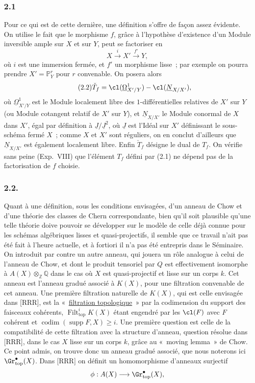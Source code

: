 \subsubsection*{2.1}
Pour ce qui est de cette dernière, une définition s'offre de façon assez évidente. On utilise le fait que le morphisme $f$, grâce à l'hypothèse d'existence d'un Module inversible ample sur $X$ et sur $Y$, peut se factoriser en
\begin{equation}\tag{2.1}
X\xrightarrow{i}X'\xrightarrow{f'}Y,
\end{equation}
où $i$ est une immersion fermée, et $f'$ un morphisme lisse~; par exemple on pourra prendre $X'=\mathbb P^r_Y$ pour $r$ convenable. On posera alors
\begin{equation}\tag{2.2}
\check T_f=\cl({\underline\Omega}^1_{X'/Y})-\cl({\underline N}_{X/X'}),
\end{equation}
où ${\underline\Omega}^1_{X'/Y}$ est le Module localement libre des $1$-différentielles relatives de $X'$ sur $Y$ (ou Module cotangent relatif de $X'$ sur $Y$), et ${\underline N}_{X/X'}$ le Module conormal de $X$ dans $X'$, égal par définition à ${\underline J}/{\underline J}^2$, où ${\underline J}$ est l'Idéal sur $X'$ définissant le sous-schéma fermé $X$~; comme $X$ et $X'$ sont réguliers, on en conclut d'ailleurs que ${\underline N}_{X/X'}$ est également localement libre. Enfin $\check T_f$ désigne le dual de $T_f$. On vérifie sans peine (Exp.\ VIII) que l'élément $T_f$ défini par (2.1) ne dépend pas de la factorisation de $f$ choisie.

\subsubsection*{2.2.}
Quant à une définition, sous les conditions envisagées, d'un anneau de Chow et d'une théorie des classes de Chern correspondante, bien qu'il soit plausible qu'une telle théorie doive pouvoir se développer sur le modèle de celle déjà connue pour les schémas algébriques lisses et quasi-projectifs, il semble que ce travail n'ait pas été fait à l'heure actuelle, et à fortiori il n'a pas été entrepris dans le Séminaire. On introduit par contre un autre anneau, qui jouera un rôle analogue à celui de l'anneau de Chow, et dont le produit tensoriel par $Q$ est effectivement isomorphe à $A(X)\otimes_{\mathbb Z}\mathbb Q$ dans le cas où $X$ est quasi-projectif et lisse sur un corps $k$. Cet anneau est l'anneau gradué associé à $K(X)$, pour une filtration convenable de cet anneau. Une première filtration naturelle de $K(X)$, qui est celle envisagée dans [RRR], est la «~\underline{filtration topologique}~» par la codimension du support des faisceaux cohérents, $\operatorname{Filt}^{i}_{\mathrm{top}}K(X)$ étant engendré par les $\cl(F)$ avec $F$ cohérent et $\operatorname{codim}(\operatorname{supp}F,X)\ge i$. Une première question est celle de la compatibilité de cette filtration avec la structure d'anneau, question résolue dans [RRR], dans le cas $X$ lisse sur un corps $k$, grâce au «~moving lemma~» de Chow. Ce point admis, on trouve donc un anneau gradué associé, que nous noterons ici $\Gr^{\bullet}_{\mathrm{top}}(X)$. Dans [RRR] on définit un homomorphisme d'anneaux surjectif
\[
\phi:A(X)\longrightarrow \Gr^{\bullet}_{\mathrm{top}}(X),
\]
